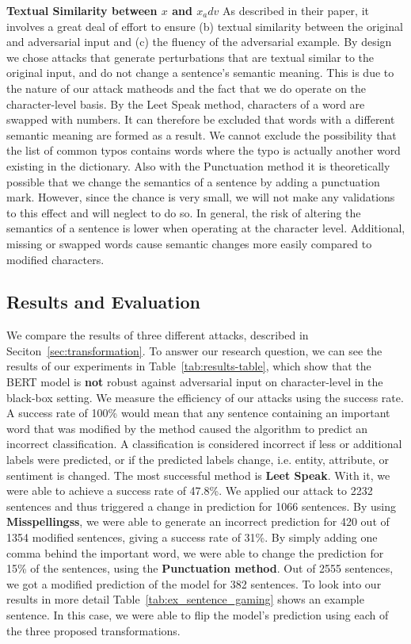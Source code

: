\textbf{Textual Similarity between $x$ and $x_adv$}
As described in their paper, it involves a great deal of effort to ensure (b) textual similarity between the original and adversarial input and (c) the fluency of the adversarial example.
By design we chose attacks that generate perturbations that are textual similar to the original input, and do not change a sentence's semantic meaning. This is due to the nature of our attack matheods and the fact that we do operate on the character-level basis. By the Leet Speak method, characters of a word are swapped with numbers. It can therefore be excluded that words with a different semantic meaning are formed as a result. We cannot exclude the possibility that the list of common typos contains words where the typo is actually another word existing in the dictionary. 
Also with the Punctuation method it is theoretically possible that we change the semantics of a sentence by adding a punctuation mark. However, since the chance is very small, we will not make any validations to this effect and will neglect to do so. 
In general, the risk of altering the semantics of a sentence is lower when operating at the character level. Additional, missing or swapped words cause semantic changes more easily compared to modified characters. 


\subsection{Results and Evaluation}
We compare the results of three different attacks, described in Seciton~\ref{sec:transformation}. To answer our research question, we can see the results of our experiments in Table~\ref{tab:results-table}, which show that the BERT model is \textbf{not} robust against adversarial input on character-level in the black-box setting.
We measure the efficiency of our attacks using the success rate. 
A success rate of 100\% would mean that any sentence containing an important word that was modified by the method caused the algorithm to predict an incorrect classification. A classification is considered incorrect if less or additional labels were predicted, or if the predicted labels change, i.e. entity, attribute, or sentiment is changed.
The most successful method is \textbf{Leet Speak}. With it, we were able to achieve a success rate of 47.8\%. 
We applied our attack to 2232 sentences and thus triggered a change in prediction for 1066 sentences. By using \textbf{Misspellingss}, we were able to generate an incorrect prediction for 420 out of 1354 modified sentences, giving a success rate of 31\%. By simply adding one comma behind the important word, we were able to change the prediction for 15\% of the sentences, using the \textbf{Punctuation method}.  Out of 2555 sentences, we got a modified prediction of the model for 382 sentences.
To look into our results in more detail Table~\ref{tab:ex_sentence_gaming} shows an example sentence. In this case, we were able to flip the model's prediction using each of the three proposed transformations.


